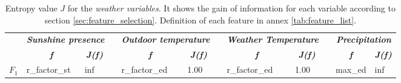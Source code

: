 \begin{table}[]
\centering
\caption{Entropy value $J$ for the \textit{weather variables}. It shows the gain of information for each variable according to section \ref{sec:feature_selection}. Definition of each feature in annex \ref{tab:feature_list}.}
\scriptsize
\label{tab:feature_gain}
\begin{tabular}{|l|l|l|l|l|l|l|l|l|lll}
\cline{1-3} \cline{5-6} \cline{8-9} \cline{11-12}
\multicolumn{1}{|c|}{\textit{\textbf{}}} & \multicolumn{2}{c|}{\cellcolor[HTML]{9AFF99}\textit{\textbf{Sunshine presence}}}                                                       & \multicolumn{1}{c|}{\textit{\textbf{}}} & \multicolumn{2}{c|}{\cellcolor[HTML]{9AFF99}\textit{\textbf{Outdoor temperature}}}                                                     & \multicolumn{1}{c|}{\textit{\textbf{}}} & \multicolumn{2}{c|}{\cellcolor[HTML]{9AFF99}\textit{\textbf{Weather Temperature}}}                                                     & \multicolumn{1}{c|}{\textit{\textbf{}}} & \multicolumn{2}{c|}{\cellcolor[HTML]{9AFF99}\textit{\textbf{Precipitation}}}                                                           \\ \cline{1-3} \cline{5-6} \cline{8-9} \cline{11-12} 
\multicolumn{1}{|c|}{\textit{\textbf{}}} & \multicolumn{1}{c|}{\cellcolor[HTML]{9AFF99}\textit{\textbf{f}}} & \multicolumn{1}{c|}{\cellcolor[HTML]{9AFF99}\textit{\textbf{J(f)}}} & \multicolumn{1}{c|}{\textit{\textbf{}}} & \multicolumn{1}{c|}{\cellcolor[HTML]{9AFF99}\textit{\textbf{f}}} & \multicolumn{1}{c|}{\cellcolor[HTML]{9AFF99}\textit{\textbf{J(f)}}} & \multicolumn{1}{c|}{\textit{\textbf{}}} & \multicolumn{1}{c|}{\cellcolor[HTML]{9AFF99}\textit{\textbf{f}}} & \multicolumn{1}{c|}{\cellcolor[HTML]{9AFF99}\textit{\textbf{J(f)}}} & \multicolumn{1}{c|}{\textit{\textbf{}}} & \multicolumn{1}{c|}{\cellcolor[HTML]{9AFF99}\textit{\textbf{f}}} & \multicolumn{1}{c|}{\cellcolor[HTML]{9AFF99}\textit{\textbf{J(f)}}} \\ \cline{1-3} \cline{5-6} \cline{8-9} \cline{11-12} 
$F_1$                                        & \cellcolor[HTML]{FFCE93}r\_factor\_st                            & \cellcolor[HTML]{FFCE93}inf                                         &                                         & \cellcolor[HTML]{FFCE93}r\_factor\_ed                            & \cellcolor[HTML]{FFCE93}1.00                                        &                                         & \cellcolor[HTML]{FFCE93}r\_factor\_ed                            & \cellcolor[HTML]{FFCE93}1.00                                        & \multicolumn{1}{l|}{}                   & \multicolumn{1}{l|}{\cellcolor[HTML]{FFCE93}max\_ed}             & \multicolumn{1}{l|}{\cellcolor[HTML]{FFCE93} inf}                       \\ \cline{1-3} \cline{5-6} \cline{8-9} \cline{11-12} 

\end{tabular}
\end{table}
